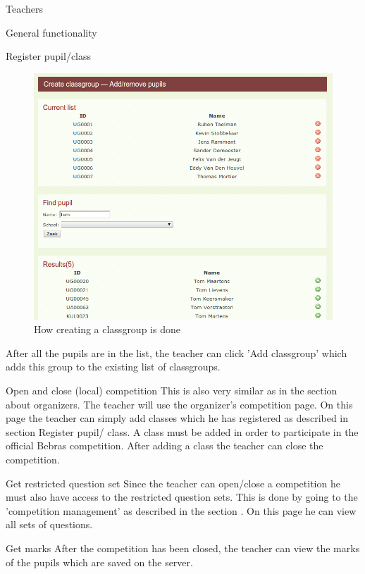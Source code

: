 \begin{section}{Teachers}
\begin{subsection}{General functionality}
\begin{subsubsection}{Register pupil/class}
	\begin{figure}[!h]
			  \centering
				\includegraphics[width=1\textwidth]{formal/img/add_remove_pupil_classgroup.png}
			  \caption{How creating a classgroup is done}
			  \label{create_classgroup}
			\end{figure}
	After all the pupils are in the list, the teacher can click 'Add classgroup' which adds this group to the existing list
	of classgroups. 
	\end{subsubsection}
	\begin{subsubsection}{Open and close (local) competition}
	This is also very similar as in the section about organizers. The teacher will use the organizer's competition page.
	On this page the teacher can simply add classes which he has registered as described in section Register pupil/ class.
	A class must be added in order to participate in the official Bebras competition. After adding a class the teacher can
	close the competition.\\
	\end{subsubsection}
	\begin{subsubsection}{Get restricted question set}
	Since the teacher can open/close a competition he must also have access to the restricted question sets. This is done by going
	to the 'competition management' as described in the section . On this page he can view all sets of questions.
	\end{subsubsection}
	\begin{subsubsection}{Get marks}
	After the competition has been closed, the teacher can view the marks of the pupils which are saved on the server.\\

\end{subsubsection}
\end{subsection}
\end{section}
